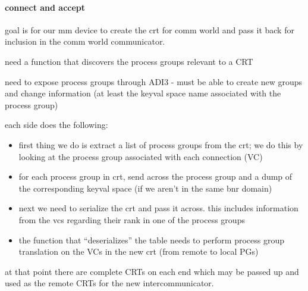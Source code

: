 \paragraph{connect and accept}

goal is for our mm device to create the crt for comm world and pass it back for
inclusion in the comm world communicator.

need a function that discovers the process groups relevant to a CRT

need to expose process groups through ADI3 - must be able to create new groups
and change information (at least the keyval space name associated with the
process group)

each side does the following:
\begin{itemize}
\item first thing we do is extract a list of process groups from the crt; we do
  this by looking at the process group associated with each connection (VC)
\item for each process group in crt, send across the process group and a dump
  of the corresponding keyval space (if we aren't in the same bnr domain)
\item next we need to serialize the crt and pass it across.  this includes
  information from the vcs regarding their rank in one of the process groups
\item the function that ``deserializes'' the table needs to perform process
  group translation on the VCs in the new crt (from remote to local PGs)
\end{itemize}

at that point there are complete CRTs on each end which may be passed up and
used as the remote CRTs for the new intercommunicator.

